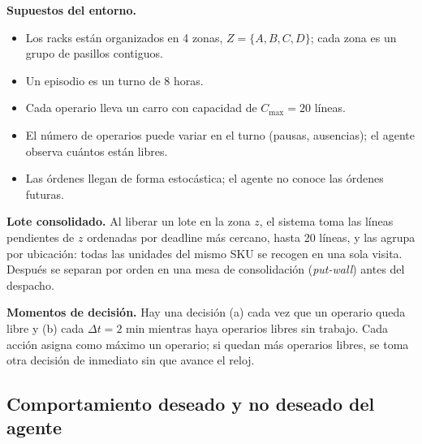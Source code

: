 \documentclass[11pt,letterpaper]{article}
\begin{document}
\textbf{Supuestos del entorno.}
\begin{itemize}
  \item Los racks están organizados en 4 zonas, $Z=\{A,B,C,D\}$; cada zona es un grupo de pasillos contiguos.
  \item Un episodio es un turno de 8 horas.
  \item Cada operario lleva un carro con capacidad de $C_{\max}=20$ líneas.
  \item El número de operarios puede variar en el turno (pausas, ausencias); el agente observa cuántos están libres.
  \item Las órdenes llegan de forma estocástica; el agente no conoce las órdenes futuras.
\end{itemize}

\textbf{Lote consolidado.} Al liberar un lote en la zona $z$, el sistema toma las líneas pendientes
de $z$ ordenadas por deadline más cercano, hasta 20 líneas, y las agrupa por ubicación: todas las
unidades del mismo SKU se recogen en una sola visita. Después se separan por orden en una mesa de
consolidación (\emph{put-wall}) antes del despacho.

\textbf{Momentos de decisión.} Hay una decisión (a) cada vez que un operario queda libre y (b) cada
$\Delta t = 2$ min mientras haya operarios libres sin trabajo. Cada acción asigna como máximo un
operario; si quedan más operarios libres, se toma otra decisión de inmediato sin que avance el reloj.

\subsection{Comportamiento deseado y no deseado del agente}
\end{document}

